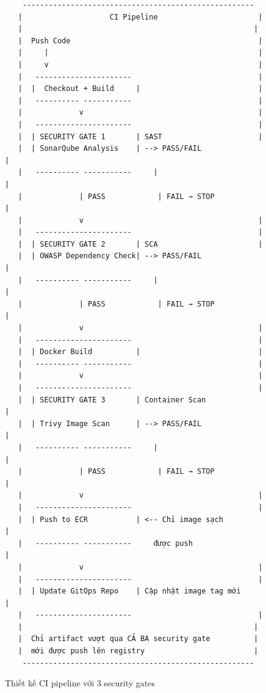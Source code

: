 \documentclass[13pt,a4paper,twoside]{extarticle}
\begin{document}
\begin{figure}[H]
\centering
\begin{verbatim}
    ----------------------------------------------------- 
   |                    CI Pipeline                       |
   |                                                     |
   |  Push Code                                           |
   |     |                                                |
   |     v                                                |
   |   ----------------------                             |
   |  |  Checkout + Build     |                           |
   |   ---------- -----------                             |
   |             v                                        |
   |   ----------------------                             |
   |  | SECURITY GATE 1       | SAST                      |
   |  | SonarQube Analysis    | --> PASS/FAIL              |
   |   ---------- -----------     |                        |
   |             | PASS            | FAIL → STOP            |
   |             v                                        |
   |   ----------------------                             |
   |  | SECURITY GATE 2       | SCA                       |
   |  | OWASP Dependency Check| --> PASS/FAIL              |
   |   ---------- -----------     |                        |
   |             | PASS            | FAIL → STOP            |
   |             v                                        |
   |   ----------------------                             |
   |  | Docker Build          |                           |
   |   ---------- -----------                             |
   |             v                                        |
   |   ----------------------                             |
   |  | SECURITY GATE 3       | Container Scan             |
   |  | Trivy Image Scan      | --> PASS/FAIL              |
   |   ---------- -----------     |                        |
   |             | PASS            | FAIL → STOP            |
   |             v                                        |
   |   ----------------------                             |
   |  | Push to ECR           | <-- Chỉ image sạch         |
   |   ---------- -----------     được push                |
   |             v                                        |
   |   ----------------------                             |
   |  | Update GitOps Repo    | Cập nhật image tag mới     |
   |   ----------------------                             |
   |                                                     |
   |  Chỉ artifact vượt qua CẢ BA security gate          |
   |  mới được push lên registry                         |
    ----------------------------------------------------- 
\end{verbatim}
\caption{Thiết kế CI pipeline với 3 security gates}
\label{fig:security-pipeline}
\end{figure}
\end{document}
